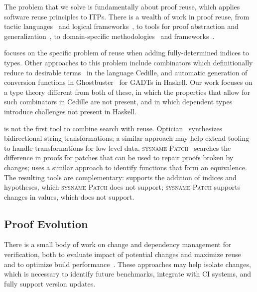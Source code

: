 The problem that we solve is fundamentally about proof reuse,
which applies software reuse principles to ITPs. 
There is a wealth of work in proof reuse, from tactic languages~\cite{felty1994generalization} and logical frameworks~\cite{caplan1995logical},
to tools for proof abstraction and generalization~\cite{pons2000generalization, johnsen2004theorem},
to domain-specific methodologies~\cite{Delaware:2011:PLT:2048066.2048113} and frameworks~\cite{Delaware:2013:MLC:2429069.2429094}.

\toolnameb focuses on the specific problem of reuse
when adding fully-determined indices to types.
Other approaches to this problem include combinators which definitionally reduce to desirable terms~\cite{DBLP:journals/corr/abs-1803-08150} in the language Cedille,
and automatic generation of conversion functions in Ghostbuster~\cite{McDonell:2016:GTS:2951913.2951914} for GADTs in Haskell.
Our work focuses on a type theory different from both of these, in which the properties that allow for such combinators in Cedille are not present, and in which dependent types introduce challenges not present in Haskell.

\toolnameb is not the first tool to combine search with reuse. 
Optician~\cite{miltner2017synthesizing} synthesizes bidirectional string transformations;
a similar approach may help extend tooling to handle transformations for low-level data.
\textsc{sysname Patch}~\cite{ringer2018adapting} 
searches the difference in proofs for patches that can be used to repair proofs broken by changes;
\toolnameb uses a similar approach to identify functions
that form an equivalence. The resulting tools are complementary: \toolnameb supports the addition
of indices and hypotheses, which \textsc{sysname Patch} does not support; \textsc{sysname Patch} supports changes
in values, which \toolnameb does not support. 

\subsection*{Proof Evolution}


There is a small body of work on change and dependency management for verification,
both to evaluate impact of potential changes and maximize reuse~\cite{873647, Autexier:2010:CMH:1986659.1986663}
and to optimize build performance~\cite{Celik:2017:IRP:3155562.3155588}.
These approaches may help isolate changes, which is necessary to identify future benchmarks, integrate
with CI systems, and fully support version updates.

